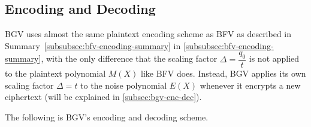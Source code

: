 \subsection{Encoding and Decoding}
\label{subsec:bgv-encoding-decoding}

BGV uses almost the same plaintext encoding scheme as BFV as described in Summary~\ref{subsubsec:bfv-encoding-summary} in \autoref{subsubsec:bfv-encoding-summary}, with the only difference that the scaling factor $\Delta = \dfrac{q_0}{t}$ is not applied to the plaintext polynomial $M(X)$ like BFV does. Instead, BGV applies its own scaling factor $\Delta = t$ to the noise polynomial $E(X)$ whenever it encrypts a new ciphertext (will be explained in \autoref{subsec:bgv-enc-dec}). 

The following is BGV's encoding and decoding scheme. 

